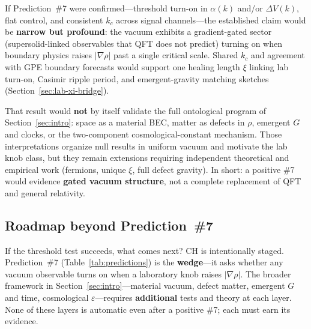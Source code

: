 \documentclass[11pt,a4paper]{article}
\begin{document}
If Prediction~\#7 were confirmed---threshold turn-on in $\alpha(k)$ and/or $\Delta V(k)$, flat control, and consistent $k_c$ across signal channels---the established claim would be \textbf{narrow but profound}: the vacuum exhibits a gradient-gated sector (supersolid-linked observables that QFT does not predict) turning on when boundary physics raises $|\nabla\rho|$ past a single critical scale.
Shared $k_c$ and agreement with GPE boundary forecasts would support one healing length $\xi$ linking lab turn-on, Casimir ripple period, and emergent-gravity matching sketches (Section~\ref{sec:lab-xi-bridge}).

That result would \textbf{not} by itself validate the full ontological program of Section~\ref{sec:intro}: space as a material BEC, matter as defects in $\rho$, emergent $G$ and clocks, or the two-component cosmological-constant mechanism.
Those interpretations organize null results in uniform vacuum and motivate the lab knob class, but they remain extensions requiring independent theoretical and empirical work (fermions, unique $\xi$, full defect gravity).
In short: a positive \#7 would evidence \textbf{gated vacuum structure}, not a complete replacement of QFT and general relativity.

\subsection{Roadmap beyond Prediction~\#7}
\label{sec:roadmap}

If the threshold test succeeds, what comes next?
CH is intentionally staged.
Prediction~\#7 (Table~\ref{tab:predictions}) is the \textbf{wedge}---it asks whether any vacuum observable turns on when a laboratory knob raises $|\nabla\rho|$.
The broader framework in Section~\ref{sec:intro}---material vacuum, defect matter, emergent $G$ and time, cosmological $\varepsilon$---requires \textbf{additional} tests and theory at each layer.
None of these layers is automatic even after a positive \#7; each must earn its evidence.
\end{document}
